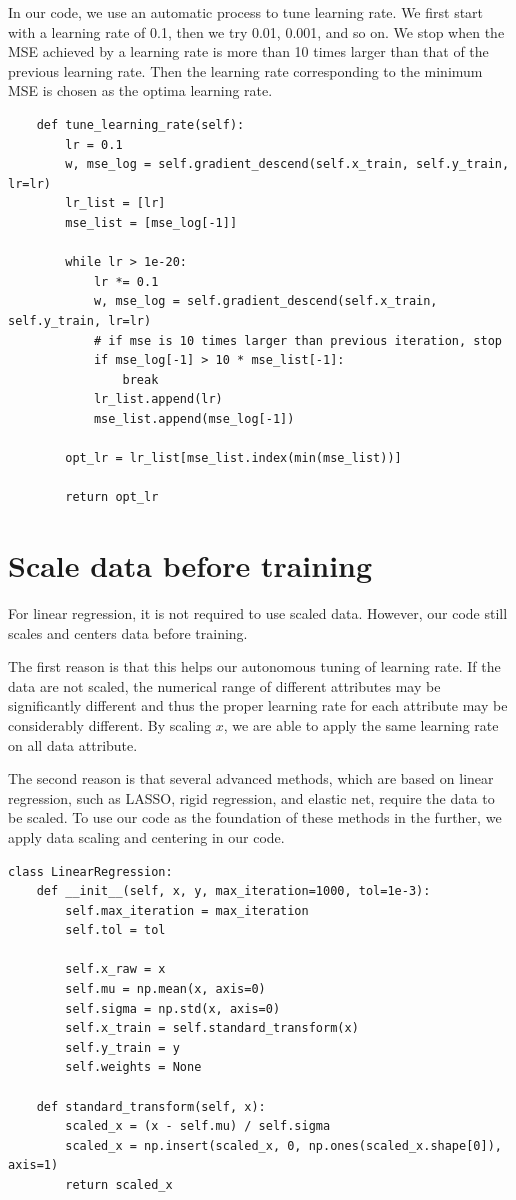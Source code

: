 \documentclass[
	letterpaper
]{article}
\begin{document}
In our code, we use an automatic process to tune learning rate. 
We first start with a learning rate of 0.1, then we try 0.01, 0.001, and so on.
We stop when the MSE achieved by a learning rate is more than 10 times larger than that of the previous learning rate.
Then the learning rate corresponding to the minimum MSE is chosen as the optima learning rate.
\begin{lstlisting}
    def tune_learning_rate(self):
        lr = 0.1
        w, mse_log = self.gradient_descend(self.x_train, self.y_train, lr=lr)
        lr_list = [lr]
        mse_list = [mse_log[-1]]

        while lr > 1e-20:
            lr *= 0.1
            w, mse_log = self.gradient_descend(self.x_train, self.y_train, lr=lr)
            # if mse is 10 times larger than previous iteration, stop
            if mse_log[-1] > 10 * mse_list[-1]:
                break
            lr_list.append(lr)
            mse_list.append(mse_log[-1])

        opt_lr = lr_list[mse_list.index(min(mse_list))]

        return opt_lr
\end{lstlisting}

\section{Scale data before training}
For linear regression, it is not required to use scaled data.
However, our code still scales and centers data before training.

The first reason is that this helps our autonomous tuning of learning rate.
If the data are not scaled, the numerical range of different attributes may be significantly different and thus the proper learning rate for each attribute may be considerably different.
By scaling $x$, we are able to apply the same learning rate on all data attribute. 

The second reason is that several advanced methods, which are based on linear regression, such as LASSO, rigid regression, and elastic net, require the data to be scaled.
To use our code as the foundation of these methods in the further, we apply data scaling and centering in our code.
\begin{lstlisting}
class LinearRegression:
    def __init__(self, x, y, max_iteration=1000, tol=1e-3):
        self.max_iteration = max_iteration
        self.tol = tol
        
        self.x_raw = x
        self.mu = np.mean(x, axis=0)
        self.sigma = np.std(x, axis=0)
        self.x_train = self.standard_transform(x)
        self.y_train = y
        self.weights = None
        
    def standard_transform(self, x):
        scaled_x = (x - self.mu) / self.sigma
        scaled_x = np.insert(scaled_x, 0, np.ones(scaled_x.shape[0]), axis=1)
        return scaled_x
\end{lstlisting}
\end{document}
